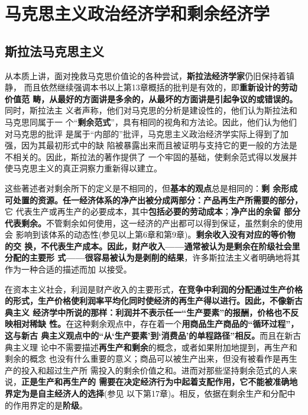 \chapter{马克思主义政治经济学和剩余经济学}  

\section{斯拉法马克思主义}

从本质上讲，面对挽救马克思价值论的各种尝试，\textbf{斯拉法经济学家}仍旧保持着镇静，
而且依然继续强调本书以上第13章概括的批判是有效的，即\textbf{重新设计的劳动价值范
  畴，从最好的方面讲是多余的，从最坏的方面讲是引起争议的或错误的。}同时，斯拉法主
义者声称，他们对马克思的分析是建设性的，他们认为斯拉法和马克思同属于一
个“\textbf{剩余范式}”，具有相同的视角和方法论。因此，他们认为他们对马克思的批评
是属于“内部的”批评，马克思主义政治经济学实际上得到了加强，因为其最初形式中的缺
陷被暴露出来而且被证明与支持它的更一般的方法是不相关的。因此，斯拉法的著作提供了
一个牢固的基础，使剩余范式得以发展并使马克思主义的真正洞察力重新得以建立。

这些著述者对剩余所下的定义是不相同的，但\textbf{基本的观点}总是相同的：\textbf{剩
  余形成可处置的资源。任一经济体系的净产出被分成两部分：产品再生产所需要的部分，}它
代表生产或再生产的必要成本，其中\textbf{包括必要的劳动成本}；\textbf{净产出的余留
  部分代表剩余。}不管剩余如何使用，这一经济的产出都可以得到保证，虽然剩余的使用会
影响到该体系的动态性(参见以上第6章和第9章)。\textbf{剩余收入没有对应的等价物的交
  换，不代表生产成本。因此，财产收入——通常被认为是剩余在阶级社会里分配的主要形
  式——很容易被认为是剥削的结果}，许多斯拉法主义者明确地将其作为一种合适的描述而加
以接受。

在资本主义社会，利润是财产收入的主要形式，\textbf{在竞争中利润的分配通过生产价格
  的形式，生产价格使利润率平均化同时使经济的再生产得以进行。因此，不像新古典主义
  经济学中所说的那样：利润并不表示任一“生产要素”的报酬，价格也不反映相对稀缺
  性。}在这种剩余观点中，存在着一个\textbf{用商品生产商品的“循环过程”，这与新古
  典主义观点中的“从‘生产要素’到‘消费品’的单程路径”相反。}而且在新古典主义理
论中不需要描述\textbf{再生产和剩余}的概念，或者如果附加地提到，再生产和剩余的概念
也没有什么重要的意义；商品可以被生产出来，但没有被看作是再生产的投入和超过生产所
需投入的剩余价值之和。进而对那些坚持剩余范式的人来说，\textbf{正是生产和再生产的
  需要在决定经济行为中起着支配作用，它不能被准确地界定为是自主经济人的选择}(参见
以下第17章)。相反，依据在剩余生产和分配中的作用界定的是\textbf{阶级}。


